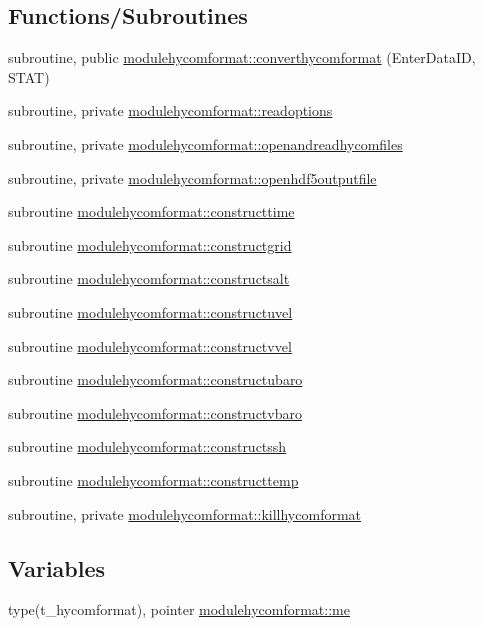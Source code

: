 \subsection*{Functions/\+Subroutines}
\begin{DoxyCompactItemize}
\item 
subroutine, public \mbox{\hyperlink{namespacemodulehycomformat_a75ba9ace07164a1aac61c55e48af9959}{modulehycomformat\+::converthycomformat}} (Enter\+Data\+ID, S\+T\+AT)
\item 
subroutine, private \mbox{\hyperlink{namespacemodulehycomformat_ad11177b2f2e56107ff56b45f4e7e04ef}{modulehycomformat\+::readoptions}}
\item 
subroutine, private \mbox{\hyperlink{namespacemodulehycomformat_acba9e941ba6903be2a19cdc9e036cd64}{modulehycomformat\+::openandreadhycomfiles}}
\item 
subroutine, private \mbox{\hyperlink{namespacemodulehycomformat_a87713c6e54c1c8b7b1a0fd423c3a6acf}{modulehycomformat\+::openhdf5outputfile}}
\item 
subroutine \mbox{\hyperlink{namespacemodulehycomformat_ad9fbb9adf5d36be1834e3ca02dacbd89}{modulehycomformat\+::constructtime}}
\item 
subroutine \mbox{\hyperlink{namespacemodulehycomformat_a9517a6d8966a57eda71abf77acd790cb}{modulehycomformat\+::constructgrid}}
\item 
subroutine \mbox{\hyperlink{namespacemodulehycomformat_a4e0166792e4a82d98b34a54327ca161b}{modulehycomformat\+::constructsalt}}
\item 
subroutine \mbox{\hyperlink{namespacemodulehycomformat_a9e6467cf7daa8b6be0aef68805d1ab7c}{modulehycomformat\+::constructuvel}}
\item 
subroutine \mbox{\hyperlink{namespacemodulehycomformat_aab97b75b8e514c72a0dbade3a8884e90}{modulehycomformat\+::constructvvel}}
\item 
subroutine \mbox{\hyperlink{namespacemodulehycomformat_a781579f6c0af167e5857fa0b7f9caf6a}{modulehycomformat\+::constructubaro}}
\item 
subroutine \mbox{\hyperlink{namespacemodulehycomformat_a26be9ece61892ddfd2166afbb12b8b28}{modulehycomformat\+::constructvbaro}}
\item 
subroutine \mbox{\hyperlink{namespacemodulehycomformat_accd71877c333ad8cebf0e4bd5b0f16d1}{modulehycomformat\+::constructssh}}
\item 
subroutine \mbox{\hyperlink{namespacemodulehycomformat_a9e994c5d27c453fa808543d635fb116e}{modulehycomformat\+::constructtemp}}
\item 
subroutine, private \mbox{\hyperlink{namespacemodulehycomformat_aa2e49450c9d2acce5c240fae7e58eb05}{modulehycomformat\+::killhycomformat}}
\end{DoxyCompactItemize}
\subsection*{Variables}
\begin{DoxyCompactItemize}
\item 
type(t\+\_\+hycomformat), pointer \mbox{\hyperlink{namespacemodulehycomformat_aa2b991be0844db8ecd1a671df3bdf8f2}{modulehycomformat\+::me}}
\end{DoxyCompactItemize}
